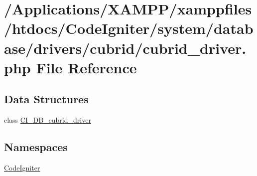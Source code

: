 \hypertarget{cubrid__driver_8php}{}\section{/\+Applications/\+X\+A\+M\+P\+P/xamppfiles/htdocs/\+Code\+Igniter/system/database/drivers/cubrid/cubrid\+\_\+driver.php File Reference}
\label{cubrid__driver_8php}
\subsection*{Data Structures}
\begin{DoxyCompactItemize}
\item 
class \mbox{\hyperlink{class_c_i___d_b__cubrid__driver}{C\+I\+\_\+\+D\+B\+\_\+cubrid\+\_\+driver}}
\end{DoxyCompactItemize}
\subsection*{Namespaces}
\begin{DoxyCompactItemize}
\item 
 \mbox{\hyperlink{namespace_code_igniter}{Code\+Igniter}}
\end{DoxyCompactItemize}

